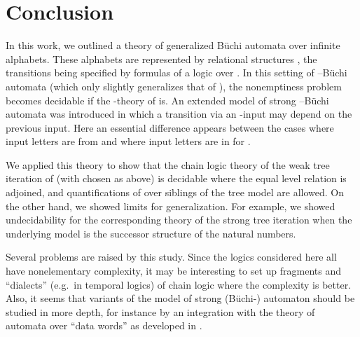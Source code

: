 \documentclass[copyright,creativecommons]{eptcs}
\theoremstyle{plain}
\theoremstyle{nonumberplain}
\begin{document}
\section{Conclusion}\label{sec_con}



In this work, we outlined a theory of generalized B\"uchi automata 
over infinite alphabets. These alphabets are represented by relational structures 
, the transitions being specified by formulas of a logic  over . 
In this setting of --B\"uchi automata (which only slightly generalizes 
that of \cite{bes08}), the nonemptiness problem becomes decidable if the -theory 
of  is. An extended model of strong --B\"uchi automata was introduced 
in which a transition via an -input may depend on the previous  input. Here 
an essential difference appears between the cases where input letters are from  
and where  input letters are in  for . 

We applied this theory to show that the chain logic theory of the weak tree 
iteration  of  (with  chosen as above) 
is decidable where the equal level relation is adjoined, and quantifications 
of  over siblings of the tree model are allowed. On the other hand, we showed limits 
for generalization. For example, we showed undecidability 
for the corresponding theory of the strong tree iteration when the underlying 
model is the successor structure of the natural numbers.  

Several problems are raised by this study. Since the logics considered here all 
have nonelementary complexity, it may be interesting to set up fragments and ``dialects''
(e.g.\ in temporal logics) of chain logic where the complexity is better. 
Also, it seems that variants of the model of strong (B\"uchi-) automaton 
should be studied in more depth, for instance by an integration with the 
theory of automata over ``data words'' as developed in \cite{nsv04,bmssd,cg09}.










\end{document}
